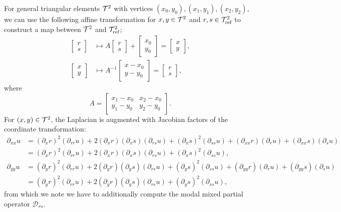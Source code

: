 For general triangular elements $\mathcal{T}^2$ with vertices $(x_0,y_0),(x_1,y_1), (x_2,y_2)$, we can use the following affine transformation for $x,y\in\mathcal{T}^2$ and $r,s\in \mathcal{T}_{\text{ref}}^2$ to construct a map between $\mathcal{T}^2$ and $\mathcal{T}_{\text{ref}}^2$;
\begin{align}
\begin{bmatrix}
r\\
s
\end{bmatrix} &\mapsto
A
\begin{bmatrix} r\\s\end{bmatrix} + 
\begin{bmatrix}
x_0\\
y_0
\end{bmatrix} = \begin{bmatrix} x \\ y \end{bmatrix},\label{duffygen}\\
\begin{bmatrix}
x\\
y
\end{bmatrix} &\mapsto A^{-1}\begin{bmatrix}
x-x_0\\
y-y_0
\end{bmatrix} = \begin{bmatrix}
r\\
s
\end{bmatrix},\label{duffygeninv}
\end{align}
where 
\begin{equation*}
A = \begin{bmatrix}
x_1-x_0 & x_2-x_0\\
y_1-y_0 & y_2-y_0
\end{bmatrix}.
\end{equation*}
For $(x,y)\in\mathcal{T}^2$, the Laplacian is augmented with Jacobian factors of the coordinate transformation:
\begin{align}
\partial_{xx} u &= (\partial_x r)^2(\partial_{rr}u) + 2(\partial_x r)(\partial_x s)(\partial_{rs}u) + (\partial_x s)^2 (\partial_{ss}u) + (\partial_{xx} r)(\partial_r u) + (\partial_{xx} s)(\partial_s u)\nonumber\\
&= (\partial_x r)^2(\partial_{rr}u) + 2(\partial_x r)(\partial_x s)(\partial_{rs}u) + (\partial_x s)^2 (\partial_{ss}u),\label{dxxmap}\\
\partial_{yy} u &= (\partial_y r)^2(\partial_{rr}u) + 2(\partial_y r)(\partial_y s)(\partial_{rs}u) + (\partial_y s)^2 (\partial_{ss}u) + (\partial_{yy} r)(\partial_r u) + (\partial_{yy} s)(\partial_s u)\nonumber\\
&=(\partial_y r)^2(\partial_{rr}u) + 2(\partial_y r)(\partial_y s)(\partial_{rs}u) + (\partial_y s)^2 (\partial_{ss}u) \label{dyymap},
\end{align}
from which we note we have to additionally compute the modal mixed partial operator $\mathcal{D}_{rs}$. 


